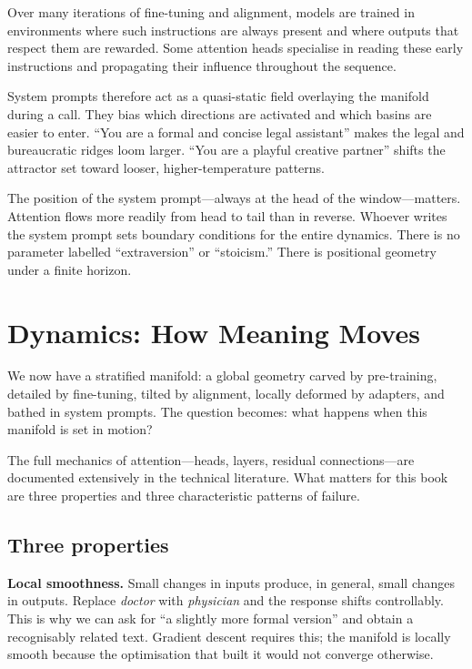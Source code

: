 Over many iterations of fine-tuning and alignment, models are trained in environments where such instructions are always present and where outputs that respect them are rewarded. Some attention heads specialise in reading these early instructions and propagating their influence throughout the sequence.

System prompts therefore act as a quasi-static field overlaying the manifold during a call. They bias which directions are activated and which basins are easier to enter. ``You are a formal and concise legal assistant'' makes the legal and bureaucratic ridges loom larger. ``You are a playful creative partner'' shifts the attractor set toward looser, higher-temperature patterns.

The position of the system prompt---always at the head of the window---matters. Attention flows more readily from head to tail than in reverse. Whoever writes the system prompt sets boundary conditions for the entire dynamics. There is no parameter labelled ``extraversion'' or ``stoicism.'' There is positional geometry under a finite horizon.


\section{Dynamics: How Meaning Moves}

We now have a stratified manifold: a global geometry carved by pre-training, detailed by fine-tuning, tilted by alignment, locally deformed by adapters, and bathed in system prompts. The question becomes: what happens when this manifold is set in motion?

The full mechanics of attention---heads, layers, residual connections---are documented extensively in the technical literature. What matters for this book are three properties and three characteristic patterns of failure.

\subsection{Three properties}

\textbf{Local smoothness.} Small changes in inputs produce, in general, small changes in outputs. Replace \emph{doctor} with \emph{physician} and the response shifts controllably. This is why we can ask for ``a slightly more formal version'' and obtain a recognisably related text. Gradient descent requires this; the manifold is locally smooth because the optimisation that built it would not converge otherwise.

